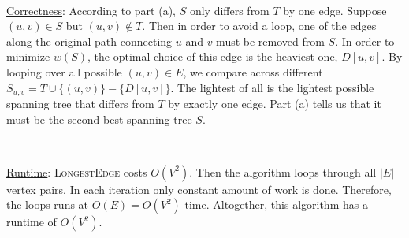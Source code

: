 \documentclass{article}
\begin{document}
~

\noindent\underline{Correctness}: According to part (a), $S$ only differs from $T$ by one edge. Suppose $(u,v)\in S$ but $(u,v)\notin T$. Then in order to avoid a loop, one of the edges along the original path connecting $u$ and $v$ must be removed from $S$. In order to minimize $w(S)$, the optimal choice of this edge is the heaviest one, $D[u,v]$. By looping over all possible $(u,v)\in E$, we compare across different $S_{u,v}=T\cup\{(u,v)\}-\{D[u,v]\}$. The lightest of all is the lightest possible spanning tree that differs from $T$ by exactly one edge. Part (a) tells us that it must be the second-best spanning tree $S$.

~

\noindent\underline{Runtime}: \textsc{LongestEdge} costs $O(V^2)$. Then the algorithm loops through all $|E|$ vertex pairs. In each iteration only constant amount of work is done. Therefore, the loops runs at $O(E)=O(V^2)$ time. Altogether, this algorithm has a runtime of $O(V^2)$.
\end{document}
